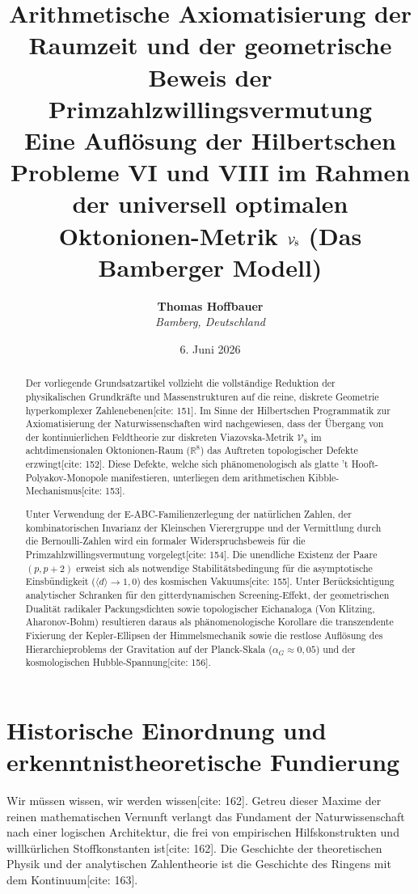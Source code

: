 \documentclass[11pt,a4paper]{article}
\title{\textbf{Arithmetische Axiomatisierung der Raumzeit und der geometrische Beweis der Primzahlzwillingsvermutung}\\
	\large Eine Auflösung der Hilbertschen Probleme VI und VIII im Rahmen der universell optimalen Oktonionen-Metrik $\Vmet$ (Das Bamberger Modell)}
\author{\textbf{Thomas Hoffbauer} \\
	\textit{Bamberg, Deutschland}}
\date{6. Juni 2026}
\newcommand{\R}{\mathbb{R}}
\newcommand{\Vmet}{\mathcal{V}_8}
\theoremstyle{definition}
\begin{document}
	
	\maketitle
	
	\begin{abstract}
		Der vorliegende Grundsatzartikel vollzieht die vollständige Reduktion der physikalischen Grundkräfte und Massenstrukturen auf die reine, diskrete Geometrie hyperkomplexer Zahlenebenen[cite: 151]. Im Sinne der Hilbertschen Programmatik zur Axiomatisierung der Naturwissenschaften wird nachgewiesen, dass der Übergang von der kontinuierlichen Feldtheorie zur diskreten Viazovska-Metrik $\Vmet$ im achtdimensionalen Oktonionen-Raum ($\R^8$) das Auftreten topologischer Defekte erzwingt[cite: 152]. Diese Defekte, welche sich phänomenologisch als glatte 't Hooft-Polyakov-Monopole manifestieren, unterliegen dem arithmetischen Kibble-Mechanismus[cite: 153]. 
		
		Unter Verwendung der E-ABC-Familienzerlegung der natürlichen Zahlen, der kombinatorischen Invarianz der Kleinschen Vierergruppe und der Vermittlung durch die Bernoulli-Zahlen wird ein formaler Widerspruchsbeweis für die Primzahlzwillingsvermutung vorgelegt[cite: 154]. Die unendliche Existenz der Paare $(p, p+2)$ erweist sich als notwendige Stabilitätsbedingung für die asymptotische Einsbündigkeit ($\langle d \rangle \rightarrow 1{,}0$) des kosmischen Vakuums[cite: 155]. Unter Berücksichtigung analytischer Schranken für den gitterdynamischen Screening-Effekt, der geometrischen Dualität radikaler Packungsdichten sowie topologischer Eichanaloga (Von Klitzing, Aharonov-Bohm) resultieren daraus als phänomenologische Korollare die transzendente Fixierung der Kepler-Ellipsen der Himmelsmechanik sowie die restlose Auflösung des Hierarchieproblems der Gravitation auf der Planck-Skala ($\alpha_G \approx 0{,}05$) und der kosmologischen Hubble-Spannung[cite: 156].
	\end{abstract}
	
	\newpage
	\tableofcontents
	\newpage
	
	\section{Historische Einordnung und erkenntnistheoretische Fundierung}
	
	Wir müssen wissen, wir werden wissen[cite: 162]. Getreu dieser Maxime der reinen mathematischen Vernunft verlangt das Fundament der Naturwissenschaft nach einer logischen Architektur, die frei von empirischen Hilfskonstrukten und willkürlichen Stoffkonstanten ist[cite: 162]. Die Geschichte der theoretischen Physik und der analytischen Zahlentheorie ist die Geschichte des Ringens mit dem Kontinuum[cite: 163].
	
\end{document}

